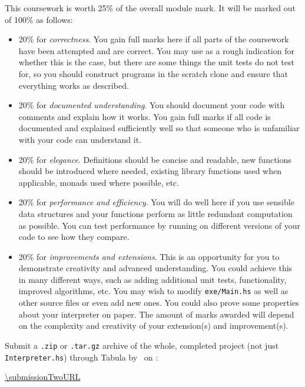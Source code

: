 This coursework is worth 25\% of the overall module mark. It will be marked out of 100\% as follows:
\begin{itemize}
	\item 20\% for \emph{correctness}. You gain full marks here if all parts of the coursework have been attempted and are correct. You may use  as a rough indication for whether this is the case, but there are some things the unit tests do not test for, so you should construct programs in the scratch clone and ensure that everything works as described.
	\item 20\% for \emph{documented understanding}. You should document your code with comments and explain how it works. You gain full marks if all code is documented and explained sufficiently well so that someone who is unfamiliar with your code can understand it.
	\item 20\% for \emph{elegance}. Definitions should be concise and readable, new functions should be introduced where needed, existing library functions used when applicable, monads used where possible, etc. 
	\item 20\% for \emph{performance and efficiency}. You will do well here if you use sensible data structures and your functions perform as little redundant computation as possible. You can test performance by running  on different versions of your code to see how they compare. 
	\item 20\% for \emph{improvements and extensions}. This is an opportunity for you to demonstrate creativity and advanced understanding. You could achieve this in many different ways, such as adding additional unit tests, functionality, improved algorithms, etc. You may wish to modify \texttt{\small exe/Main.hs} as well as other source files or even add new ones. You could also prove some properties about your interpreter on paper. The amount of marks awarded will depend on the complexity and creativity of your extension(s) and improvement(s).
\end{itemize}
Submit a \texttt{\small .zip} or \texttt{\small .tar.gz} archive of the whole, completed project (not just \texttt{\small Interpreter.hs}) through Tabula by \deadlineTwoTime\ on \deadlineTwoDate:

\begin{center} 
\url{\submissionTwoURL}
\end{center}
